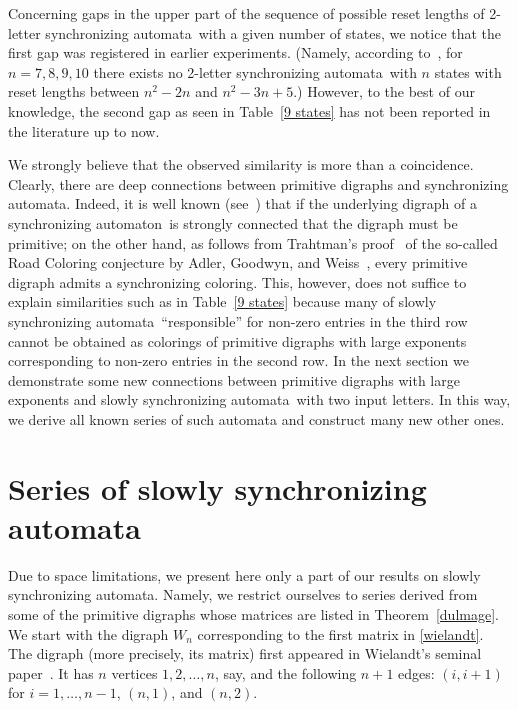 \documentclass[11pt]{llncs}
\newcommand{\sa}{synchronizing automata}
\newcommand{\san}{synchronizing automaton}
\begin{document}
Concerning gaps in the upper part of the sequence of possible reset lengths of
2-letter \sa\ with a given number of states, we notice that the first gap was
registered in earlier experiments. (Namely, according to~\cite{Tr06,Tr06a},
for $n=7,8,9,10$ there exists no 2-letter \sa\ with $n$ states with reset lengths
between $n^2-2n$ and $n^2-3n+5$.) However, to the best of our knowledge, the second
gap as seen in Table~\ref{9 states} has not been reported in the literature up to now.

We strongly believe that the observed similarity is more than a coincidence.
Clearly, there are deep connections between primitive digraphs and \sa. Indeed,
it is well known (see~\cite{AGW}) that if the underlying digraph of a \san\
is strongly connected that the digraph must be primitive; on the other hand,
as follows from Trahtman's proof~\cite{Tr09} of the so-called Road Coloring
conjecture by Adler, Goodwyn, and Weiss~\cite{AGW}, every primitive digraph
admits a synchronizing coloring. This, however, does not suffice to explain
similarities such as in Table~\ref{9 states} because many of slowly \sa\
``responsible'' for non-zero entries in the third row cannot be obtained
as colorings of primitive digraphs with large exponents corresponding
to non-zero entries in the second row. In the next section we demonstrate
some new connections between primitive digraphs with large exponents and
slowly \sa\ with two input letters. In this way, we derive all known
series of such automata and construct many new other ones.

\section{Series of slowly \sa}
\label{sss}

Due to space limitations, we present here only a part of our results on slowly \sa.
Namely, we restrict ourselves to series derived from some of the primitive digraphs
whose matrices are listed in Theorem~\ref{dulmage}. We start with the digraph $W_n$
corresponding to the first matrix in \eqref{wielandt}. The digraph (more precisely,
its matrix) first appeared in Wielandt's seminal paper~\cite{Wi50}. It has $n$
vertices $1,2,\dots,n$, say, and the following $n+1$ edges: $(i,i+1)$ for
$i=1,\dots,n-1$, $(n,1)$, and $(n,2)$.
\end{document}
